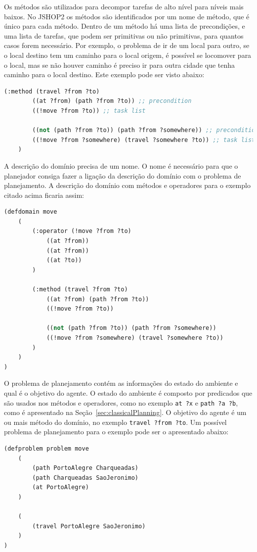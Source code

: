 Os métodos são utilizados para decompor tarefas de alto nível para níveis mais baixos. 
No JSHOP2 os métodos são identificados por um nome de método, que é único para cada método. 
Dentro de um método há uma lista de precondições, e uma lista de tarefas, que podem ser primitivas ou não primitivas, para quantos casos forem necessário. 
Por exemplo, o problema de ir de um local para outro, se o local destino tem um caminho para o local origem, é possível se locomover para o local, mas se não houver caminho é preciso ir para outra cidade que tenha caminho para o local destino. 
Este exemplo pode ser visto abaixo:

\lstset{style=codeStyle}
\begin{lstlisting}[language=lisp]
	(:method (travel ?from ?to)
		((at ?from) (path ?from ?to)) ;; precondition 
		((!move ?from ?to)) ;; task list
		
		((not (path ?from ?to)) (path ?from ?somewhere)) ;; precondition 
		((!move ?from ?somewhere) (travel ?somewhere ?to)) ;; task list
	)
\end{lstlisting}

A descrição do domínio precisa de um nome. 
O nome é necessário para que o planejador consiga fazer a ligação da descrição do domínio com o problema de planejamento. 
A descrição do domínio com métodos e operadores para o exemplo citado acima ficaria assim:

\lstset{style=codeStyle}
\begin{lstlisting}[language=lisp]
(defdomain move
	(	
		(:operator (!move ?from ?to) 
			((at ?from)) 
			((at ?from))
			((at ?to))
		)
		
		(:method (travel ?from ?to)
			((at ?from) (path ?from ?to))
			((!move ?from ?to))
		
			((not (path ?from ?to)) (path ?from ?somewhere))
			((!move ?from ?somewhere) (travel ?somewhere ?to))
		)    
	)
)
\end{lstlisting}

O problema de planejamento contém as informações do estado do ambiente e qual é o objetivo do agente. 
O estado do ambiente é composto por predicados que são usados nos métodos e operadores, como no exemplo \texttt{at ?x} e \texttt{path ?a ?b}, como é apresentado na Seção~\ref{sec:classicalPlanning}.
O objetivo do agente é um ou mais método do domínio, no exemplo \texttt{travel ?from ?to}. Um possível problema de planejamento para o exemplo pode ser o apresentado abaixo:


\begin{lstlisting}[language=lisp]
(defproblem problem move
	( 
		(path PortoAlegre Charqueadas)
		(path Charqueadas SaoJeronimo)
		(at PortoAlegre)
	)
	
	(
		(travel PortoAlegre SaoJeronimo)
	)
)
\end{lstlisting}

